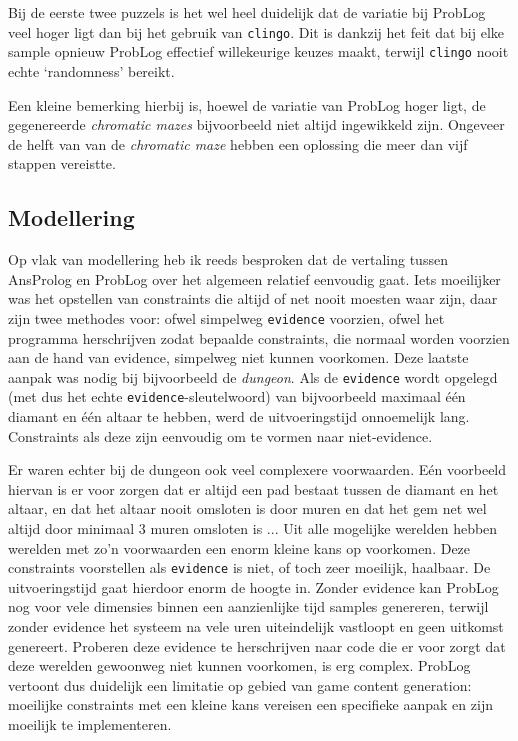 \documentclass{article}
\begin{document}
	Bij de eerste twee puzzels is het wel heel duidelijk dat de variatie bij ProbLog veel hoger ligt dan bij het gebruik van \texttt{clingo}. Dit is dankzij het feit dat bij elke sample opnieuw ProbLog effectief willekeurige keuzes maakt, terwijl \texttt{clingo} nooit echte `randomness' bereikt.
	
Een kleine bemerking hierbij is, hoewel de variatie van ProbLog hoger ligt, de gegenereerde \textit{chromatic mazes} bijvoorbeeld niet altijd ingewikkeld zijn. Ongeveer de helft van van de \textit{chromatic maze} hebben een oplossing die meer dan vijf stappen vereistte.

	\subsection{Modellering}
	Op vlak van modellering heb ik reeds besproken dat de vertaling tussen AnsProlog en ProbLog over het algemeen relatief eenvoudig gaat. Iets moeilijker was het opstellen van constraints die altijd of net nooit moesten waar zijn, daar zijn twee methodes voor: ofwel simpelweg \texttt{evidence} voorzien, ofwel het programma herschrijven zodat bepaalde constraints, die normaal worden voorzien aan de hand van evidence, simpelweg niet kunnen voorkomen. Deze laatste aanpak was nodig bij bijvoorbeeld de \textit{dungeon}. Als de \texttt{evidence} wordt opgelegd (met dus het echte \texttt{evidence}-sleutelwoord) van bijvoorbeeld maximaal \'e\'en diamant en \'e\'en altaar te hebben, werd de uitvoeringstijd onnoemelijk lang. Constraints als deze zijn eenvoudig om te vormen naar niet-evidence. 
	
	Er waren echter bij de dungeon ook veel complexere voorwaarden. E\'en voorbeeld hiervan is er voor zorgen dat er altijd een pad bestaat tussen de diamant en het altaar, en dat het altaar nooit omsloten is door muren en dat het gem net wel altijd door minimaal 3 muren omsloten is ... Uit alle mogelijke werelden hebben werelden met zo'n voorwaarden een enorm kleine kans op voorkomen. Deze constraints voorstellen als \texttt{evidence} is niet, of toch zeer moeilijk, haalbaar. De uitvoeringstijd gaat hierdoor enorm de hoogte in. Zonder evidence kan ProbLog nog voor vele dimensies binnen een aanzienlijke tijd samples genereren, terwijl zonder evidence het systeem na vele uren uiteindelijk vastloopt en geen uitkomst genereert. Proberen deze evidence te herschrijven naar code die er voor zorgt dat deze werelden gewoonweg niet kunnen voorkomen, is erg complex.  ProbLog vertoont dus duidelijk een limitatie op gebied van game content generation: moeilijke constraints met een kleine kans vereisen een specifieke aanpak en zijn moeilijk te implementeren.
	
\end{document}
